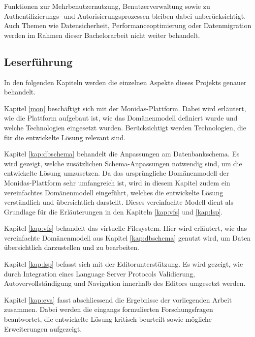 Funktionen zur Mehrbenutzernutzung,  Benutzerverwaltung sowie zu Authentifizierungs- und Autorisierungsprozessen bleiben dabei unberücksichtigt. Auch Themen wie Datensicherheit, Performanceoptimierung oder Datenmigration werden im Rahmen dieser Bachelorarbeit nicht weiter behandelt.

\subsection{Leserführung}
In den folgenden Kapiteln werden die einzelnen Aspekte dieses Projekts genauer behandelt.
 
Kapitel \ref{mon} beschäftigt sich mit der Monidas-Plattform. Dabei wird erläutert, wie die Plattform aufgebaut ist, wie das Domänenmodell definiert wurde und welche Technologien eingesetzt wurden. Berücksichtigt werden Technologien, die für die entwickelte Lösung relevant sind.

Kapitel \ref{kap:dbschema} behandelt die Anpassungen am Datenbankschema. Es wird gezeigt, welche zusätzlichen Schema-Anpassungen notwendig sind, um die entwickelte Lösung umzusetzen. Da das ursprüngliche Domänenmodell der Monidas-Plattform sehr umfangreich ist, wird in diesem Kapitel zudem ein vereinfachtes Domänenmodell eingeführt, welches die entwickelte Lösung verständlich und übersichtlich darstellt. Dieses vereinfachte Modell dient als Grundlage für die Erläuterungen in den Kapiteln \ref{kap:vfs} und \ref{kap:lsp}.

Kapitel \ref{kap:vfs}  behandelt das virtuelle Filesystem. Hier wird erläutert, wie das vereinfachte Domänenmodell aus Kapitel \ref{kap:dbschema} genutzt wird, um Daten übersichtlich darzustellen und zu bearbeiten.

Kapitel \ref{kap:lsp} befasst sich mit der Editorunterstützung. Es wird gezeigt, wie durch Integration eines Language Server Protocols Validierung, Autovervollständigung und Navigation innerhalb des Editors umgesetzt werden.

Kapitel \ref{kap:eva} fasst abschliessend die Ergebnisse der vorliegenden Arbeit zusammen. Dabei werden die eingangs formulierten Forschungsfragen beantwortet, die entwickelte Lösung kritisch beurteilt sowie mögliche Erweiterungen aufgezeigt.




